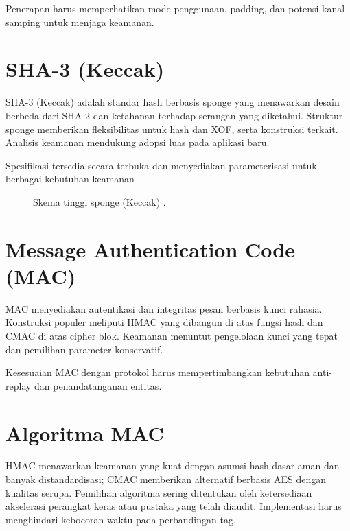 \documentclass[../main.tex]{subfiles}
\begin{document}
Penerapan harus memperhatikan mode penggunaan, padding, dan potensi kanal samping untuk menjaga keamanan.

\section{SHA-3 (Keccak)}
SHA-3 (Keccak) adalah standar hash berbasis sponge yang menawarkan desain berbeda dari SHA-2 dan ketahanan terhadap serangan yang diketahui. Struktur sponge memberikan fleksibilitas untuk hash dan XOF, serta konstruksi terkait. Analisis keamanan mendukung adopsi luas pada aplikasi baru.

Spesifikasi tersedia secara terbuka dan menyediakan parameterisasi untuk berbagai kebutuhan keamanan \parencite{fips202}.

\begin{figure}[h]
\centering
{}
\caption{Skema tinggi sponge (Keccak) \parencite{fips202,bertoni2013keccak}.}
\label{fig:sponge}
\end{figure}

\section{Message Authentication Code (MAC)}
MAC menyediakan autentikasi dan integritas pesan berbasis kunci rahasia. Konstruksi populer meliputi HMAC yang dibangun di atas fungsi hash dan CMAC di atas cipher blok. Keamanan menuntut pengelolaan kunci yang tepat dan pemilihan parameter konservatif.

Kesesuaian MAC dengan protokol harus mempertimbangkan kebutuhan anti-replay dan penandatanganan entitas.

\section{Algoritma MAC}
HMAC menawarkan keamanan yang kuat dengan asumsi hash dasar aman dan banyak distandardisasi; CMAC memberikan alternatif berbasis AES dengan kualitas serupa. Pemilihan algoritma sering ditentukan oleh ketersediaan akselerasi perangkat keras atau pustaka yang telah diaudit. Implementasi harus menghindari kebocoran waktu pada perbandingan tag.
\end{document}
